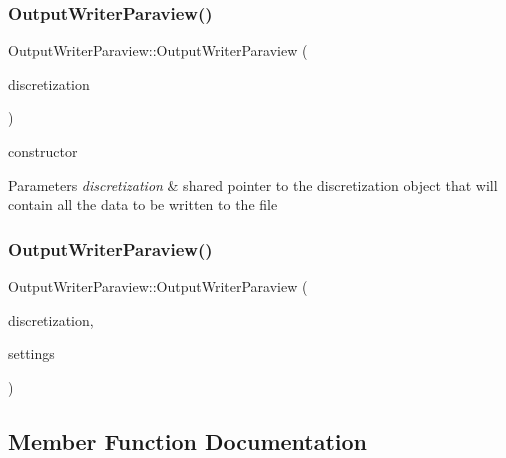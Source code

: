 \subsubsection{\texorpdfstring{OutputWriterParaview()}{OutputWriterParaview()}\hspace{0.1cm}{\footnotesize\ttfamily [1/2]}}
{\footnotesize\ttfamily Output\+Writer\+Paraview\+::\+Output\+Writer\+Paraview (\begin{DoxyParamCaption}\item[{std\+::shared\+\_\+ptr$<$ \mbox{\hyperlink{classDiscretization}{Discretization}} $>$}]{discretization }\end{DoxyParamCaption})}

constructor 
\begin{DoxyParams}{Parameters}
{\em discretization} & shared pointer to the discretization object that will contain all the data to be written to the file \\
\hline
\end{DoxyParams}
\mbox{\label{classOutputWriterParaview_abf652df2ff830523dc838a476f39b379}} 
\subsubsection{\texorpdfstring{OutputWriterParaview()}{OutputWriterParaview()}\hspace{0.1cm}{\footnotesize\ttfamily [2/2]}}
{\footnotesize\ttfamily Output\+Writer\+Paraview\+::\+Output\+Writer\+Paraview (\begin{DoxyParamCaption}\item[{std\+::shared\+\_\+ptr$<$ \mbox{\hyperlink{classDiscretization}{Discretization}} $>$}]{discretization,  }\item[{\mbox{\hyperlink{structSettings}{Settings}}}]{settings }\end{DoxyParamCaption})}



\subsection{Member Function Documentation}
\mbox{\label{classOutputWriterParaview_a9e203b63d0e2f26ad53d18ee1821c6bb}} 
